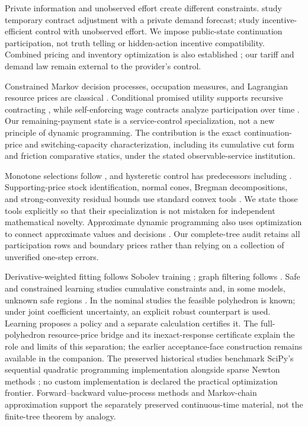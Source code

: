 \documentclass[11pt,letterpaper]{article}
\theoremstyle{definition}
\newcommand{\1}{\mathbf 1}
\begin{document}
Private information and unobserved effort create different constraints. \citet{NasserTurcic2019} study temporary contract adjustment with a private demand forecast; \citet{PlambeckZenios2003} study incentive-efficient control with unobserved effort. We impose public-state continuation participation, not truth telling or hidden-action incentive compatibility. Combined pricing and inventory optimization is also established \citep{FedergruenHeching1999}; our tariff and demand law remain external to the provider's control.

Constrained Markov decision processes, occupation measures, and Lagrangian resource prices are classical \citep{Altman1999}. Conditional promised utility supports recursive contracting \citep{SpearSrivastava1987}, while self-enforcing wage contracts analyze participation over time \citep{ThomasWorrall1988}. Our remaining-payment state is a service-control specialization, not a new principle of dynamic programming. The contribution is the exact continuation-price and switching-capacity characterization, including its cumulative cut form and friction comparative statics, under the stated observable-service institution.

Monotone selections follow \citet{Topkis1978}, and hysteretic control has predecessors including \citet{HippHolzbaur1988}. Supporting-price stock identification, normal cones, Bregman decompositions, and strong-convexity residual bounds use standard convex tools \citep{BoydVandenberghe2004}. We state those tools explicitly so that their specialization is not mistaken for independent mathematical novelty. Approximate dynamic programming also uses optimization to connect approximate values and decisions \citep{DeFariasVanRoy2003}. Our complete-tree audit retains all participation rows and boundary prices rather than relying on a collection of unverified one-step errors.

Derivative-weighted fitting follows Sobolev training \citep{Czarnecki2017}; graph filtering follows \citet{Defferrard2016}. Safe and constrained learning studies cumulative constraints and, in some models, unknown safe regions \citep{Satija2020,WachiSui2020}. In the nominal studies the feasible polyhedron is known; under joint coefficient uncertainty, an explicit robust counterpart is used. Learning proposes a policy and a separate calculation certifies it. The full-polyhedron resource-price bridge and its inexact-response certificate explain the role and limits of this separation; the earlier acceptance-face construction remains available in the companion. The preserved historical studies benchmark SciPy's sequential quadratic programming implementation alongside sparse Newton methods \citep{Virtanen2020}; no custom implementation is declared the practical optimization frontier. Forward--backward value-process methods \citep{MaProtterYong1994,HanJentzenE2018} and Markov-chain approximation \citep{KushnerDupuis2001} support the separately preserved continuous-time material, not the finite-tree theorem by analogy.
\end{document}
